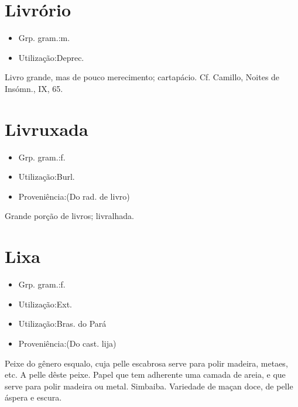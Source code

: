 \section{Livrório}
\begin{itemize}
\item {Grp. gram.:m.}
\end{itemize}
\begin{itemize}
\item {Utilização:Deprec.}
\end{itemize}
Livro grande, mas de pouco merecimento; cartapácio. Cf. Camillo, \textunderscore Noites de Insómn.\textunderscore , IX, 65.
\section{Livruxada}
\begin{itemize}
\item {Grp. gram.:f.}
\end{itemize}
\begin{itemize}
\item {Utilização:Burl.}
\end{itemize}
\begin{itemize}
\item {Proveniência:(Do rad. de \textunderscore livro\textunderscore )}
\end{itemize}
Grande porção de livros; livralhada.
\section{Lixa}
\begin{itemize}
\item {Grp. gram.:f.}
\end{itemize}
\begin{itemize}
\item {Utilização:Ext.}
\end{itemize}
\begin{itemize}
\item {Utilização:Bras. do Pará}
\end{itemize}
\begin{itemize}
\item {Proveniência:(Do cast. \textunderscore lija\textunderscore )}
\end{itemize}
Peixe do gênero esqualo, cuja pelle escabrosa serve para polir madeira, metaes, etc.
A pelle dêste peixe.
Papel que tem adherente uma camada de areia, e que serve para polir madeira ou metal.
Simbaiba.
Variedade de maçan doce, de pelle áspera e escura.
